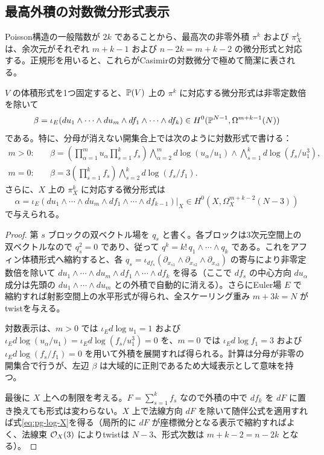 \subsection{最高外積の対数微分形式表示}
Poisson構造の一般階数が $2k$ であることから、最高次の非零外積 $\pi^k$ および $\pi_X^k$ は、余次元がそれぞれ $m+k-1$ および $n-2k=m+k-2$ の微分形式と対応する。正規形を用いると、これらがCasimirの対数微分で極めて簡潔に表される。

\begin{proposition}\label{prop:pg-log}
$V$ の体積形式を1つ固定すると、$\mathbb P(V)$ 上の $\pi^k$ に対応する微分形式は非零定数倍を除いて
\begin{equation}
\beta=\iota_E(du_1\wedge\cdots\wedge du_m\wedge df_1\wedge\cdots\wedge df_k)
\in H^0(\mathbb P^{N-1},\Omega^{m+k-1}(N))\label{eq:pg-log-main}
\end{equation}
である。特に、分母が消えない開集合上では次のように対数形式で書ける：
\begin{align}
m>0:\quad &\beta=\left(\prod_{\alpha=1}^m u_\alpha\prod_{s=1}^kf_s\right)
\bigwedge_{\alpha=2}^m d\log(u_\alpha/u_1)
\wedge\bigwedge_{s=1}^k d\log(f_s/u_1^3),\\
m=0:\quad &\beta=3\left(\prod_{s=1}^kf_s\right)
\bigwedge_{s=2}^k d\log(f_s/f_1).
\end{align}
さらに、$X$ 上の $\pi_X^k$ に対応する微分形式は
\begin{equation}
\alpha=\iota_E(du_1\wedge\cdots\wedge du_m\wedge df_1\wedge\cdots\wedge df_{k-1})|_X
\in H^0(X,\Omega_X^{m+k-2}(N-3))\label{eq:pg-log-X}
\end{equation}
で与えられる。
\end{proposition}
\begin{proof}
第 $s$ ブロックの双ベクトル場を $q_s$ と書く。各ブロックは3次元空間上の双ベクトルなので $q_s^2=0$ であり、従って $q^k=k!\,q_1\wedge\cdots\wedge q_k$ である。これをアフィン体積形式へ縮約すると、各 $q_s=\iota_{df_s}(\partial_{x_{s1}}\wedge\partial_{x_{s2}}\wedge\partial_{x_{s3}})$ の寄与により非零定数倍を除いて $du_1\wedge\cdots\wedge du_m\wedge df_1\wedge\cdots\wedge df_k$ を得る（ここで $df_s$ の中心方向 $du_\alpha$ 成分は先頭の $du_1\wedge\cdots\wedge du_m$ との外積で自動的に消える）。さらにEuler場 $E$ で縮約すれば射影空間上の水平形式が得られ、全スケーリング重み $m+3k=N$ がtwistを与える。

対数表示は、$m>0$ では $\iota_E d\log u_1=1$ および $\iota_E d\log(u_\alpha/u_1)=\iota_E d\log(f_s/u_1^3)=0$ を、$m=0$ では $\iota_E d\log f_1=3$ および $\iota_E d\log(f_s/f_1)=0$ を用いて外積を展開すれば得られる。計算は分母が非零の開集合で行うが、左辺 $\beta$ は大域的に正則であるため大域表示として意味を持つ。

最後に $X$ 上への制限を考える。$F=\sum_{s=1}^k f_s$ なので外積の中で $df_k$ を $dF$ に置き換えても形式は変わらない。$X$ 上で法線方向 $dF$ を除いて随伴公式を適用すれば式\eqref{eq:pg-log-X}を得る（局所的に $dF$ が座標微分となる表示で縮約すればよく、法線束 $\mathcal O_X(3)$ によりtwistは $N-3$、形式次数は $m+k-2=n-2k$ となる）。
\end{proof}

